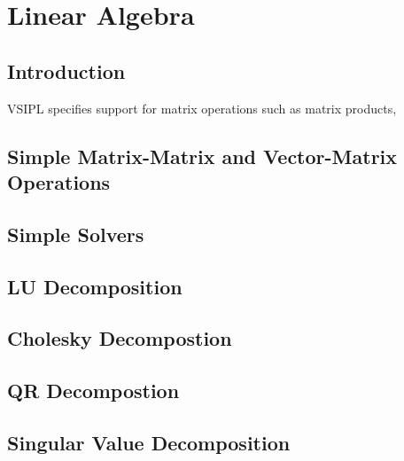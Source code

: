 \chapter{Linear Algebra}
\section*{Introduction}
VSIPL specifies support for matrix operations such as matrix products, 
\section*{Simple Matrix-Matrix and Vector-Matrix Operations}
\section*{Simple Solvers}
\section*{LU Decomposition}
\section*{Cholesky Decompostion}
\section*{QR Decompostion}
\section*{Singular Value Decomposition}

